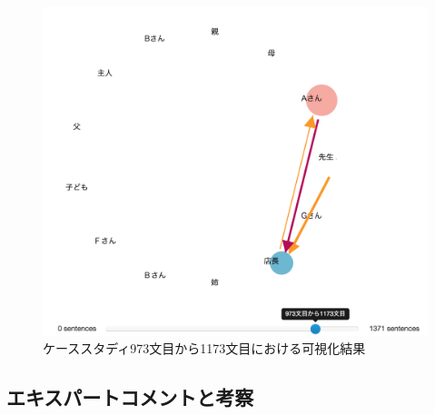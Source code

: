\documentclass[shuuron]{kuee}
\begin{document}
\begin{figure}
  \begin{center}
    \includegraphics[width=\linewidth]{caseThird.png}
  \end{center}
  \caption{ケーススタディ973文目から1173文目における可視化結果}
  \label{fig:caseThird}
\end{figure}

%

\subsection{エキスパートコメントと考察}
\end{document}
